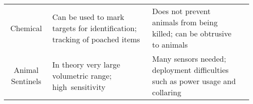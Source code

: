 \begin{table}[htbp]
{\begin{tabular}{cp{20.28em}p{20.28em}c}
Chemical & Can be used to mark targets for identification; tracking of poached items & Does not prevent animals from being killed; can be obtrusive to animals & \citep{Zhou2012,Petersen2002,SouthAfrican,AndersonBradleyandJooste2014,Milliken,Mukwazvure2014} \\
Animal Sentinels & In theory very large volumetric range; high~sensitivity  & Many sensors needed; deployment difficulties such as power usage and collaring & \citep{Sahin2007,FirmatBanzi2014,Recio2011,Petersen2002} \\
\bottomrule
\end{tabular}%
}
	\label{tab:technology_comparison}%
\end{table}%